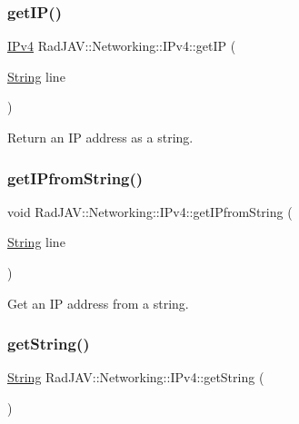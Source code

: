 \subsubsection{\texorpdfstring{get\+I\+P()}{getIP()}}
{\footnotesize\ttfamily \mbox{\hyperlink{class_rad_j_a_v_1_1_networking_1_1_i_pv4}{I\+Pv4}} Rad\+J\+A\+V\+::\+Networking\+::\+I\+Pv4\+::get\+IP (\begin{DoxyParamCaption}\item[{\mbox{\hyperlink{class_rad_j_a_v_1_1_string}{String}}}]{line }\end{DoxyParamCaption})\hspace{0.3cm}{\ttfamily [static]}}

Return an IP address as a string. \mbox{\label{class_rad_j_a_v_1_1_networking_1_1_i_pv4_af1ad0c90ed3f6a590bfd7b1de617a699}} 
\subsubsection{\texorpdfstring{get\+I\+Pfrom\+String()}{getIPfromString()}}
{\footnotesize\ttfamily void Rad\+J\+A\+V\+::\+Networking\+::\+I\+Pv4\+::get\+I\+Pfrom\+String (\begin{DoxyParamCaption}\item[{\mbox{\hyperlink{class_rad_j_a_v_1_1_string}{String}}}]{line }\end{DoxyParamCaption})}

Get an IP address from a string. \mbox{\label{class_rad_j_a_v_1_1_networking_1_1_i_pv4_a6c418be8e5836120e69f32e051c1ca8b}} 
\subsubsection{\texorpdfstring{get\+String()}{getString()}\hspace{0.1cm}{\footnotesize\ttfamily [1/2]}}
{\footnotesize\ttfamily \mbox{\hyperlink{class_rad_j_a_v_1_1_string}{String}} Rad\+J\+A\+V\+::\+Networking\+::\+I\+Pv4\+::get\+String (\begin{DoxyParamCaption}{ }\end{DoxyParamCaption})}


